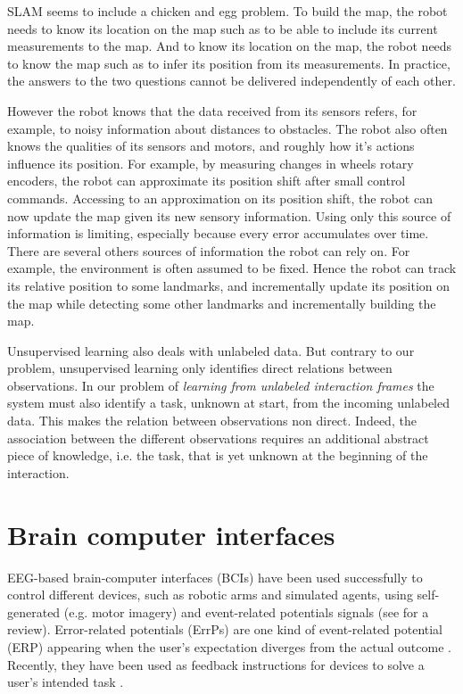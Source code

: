 SLAM seems to include a chicken and egg problem. To build the map, the robot needs to know its location on the map such as to be able to include its current measurements to the map. And to know its location on the map, the robot needs to know the map such as to infer its position from its measurements. In practice, the answers to the two questions cannot be delivered independently of each other.

However the robot knows that the data received from its sensors refers, for example, to noisy information about distances to obstacles. The robot also often knows the qualities of its sensors and motors, and roughly how it's actions influence its position. For example, by measuring changes in wheels rotary encoders, the robot can approximate its position shift after small control commands. Accessing to an approximation on its position shift, the robot can now update the map given its new sensory information. Using only this source of information is limiting, especially because every error accumulates over time. There are several others sources of information the robot can rely on. For example, the environment is often assumed to be fixed. Hence the robot can track its relative position to some landmarks, and incrementally update its position on the map while detecting some other landmarks and incrementally building the map.

\transition

Unsupervised learning also deals with unlabeled data. But contrary to our problem, unsupervised learning only identifies direct relations between observations. In our problem of \emph{learning from unlabeled interaction frames} the system must also identify a task, unknown at start, from the incoming unlabeled data. This makes the relation between observations non direct. Indeed, the association between the different observations requires an additional abstract piece of knowledge, i.e. the task, that is yet unknown at the beginning of the interaction.

\section{Brain computer interfaces}

EEG-based brain-computer interfaces (BCIs) have been used successfully to control different devices, such as robotic arms and simulated agents, using self-generated (e.g. motor imagery) and event-related potentials signals (see \cite{millan10} for a review). Error-related potentials (ErrPs) are one kind of event-related potential (ERP) appearing when the user's expectation diverges from the actual outcome \cite{Falkenstein00,chavarriaga2014errare}. Recently, they have been used as feedback instructions for devices to solve a user's intended task \cite{chavarriaga2010learning,iturrate13}.

